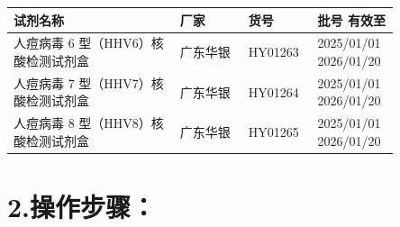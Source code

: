 \documentclass[UTF8,10pt,a4paper,fontset=fandol]{ctexart}
\newcommand{\fieldvalue}[1]{#1}
\newcommand{\handwritten}[1]{#1}
\begin{document}
\begin{center}
\small
\begin{tabular}{|p{0.39\linewidth}|p{0.16\linewidth}|p{0.15\linewidth}|p{0.15\linewidth}|}
\hline
\textbf{试剂名称} & \textbf{厂家} & \textbf{货号} & \textbf{批号} \quad \textbf{有效至}\\
\hline
人痘病毒 6 型（HHV6）核酸检测试剂盒
&
广东华银
&
HY01263
&
\fieldvalue{\handwritten{2025/01/01}}
\quad
\fieldvalue{\handwritten{2026/01/20}}
\\
\hline
人痘病毒 7 型（HHV7）核酸检测试剂盒
&
广东华银
&
HY01264
&
\fieldvalue{\handwritten{2025/01/01}}
\quad
\fieldvalue{\handwritten{2026/01/20}}
\\
\hline
人痘病毒 8 型（HHV8）核酸检测试剂盒
&
广东华银
&
HY01265
&
\fieldvalue{\handwritten{2025/01/01}}
\quad
\fieldvalue{\handwritten{2026/01/20}}
\\
\hline
\end{tabular}
\end{center}

\section*{2.\quad 操作步骤：}
\end{document}
